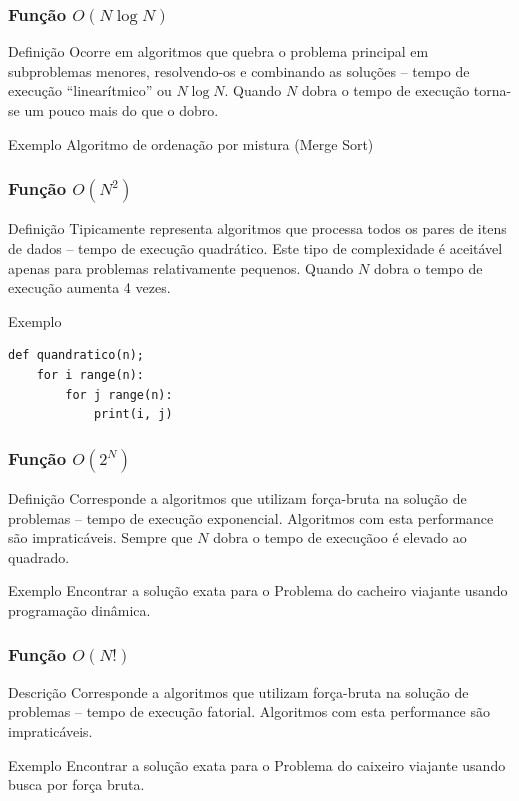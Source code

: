 \documentclass{beamer}
\begin{document}
\begin{frame}[fragile]
\frametitle{Função $O(N \log N)$}

\begin{block}{Definição}
Ocorre em algoritmos que quebra o problema principal em subproblemas menores, resolvendo-os e combinando as soluções -- tempo de execução ``linearítmico'' ou $N \log N$. Quando $N$ dobra o tempo de execução torna-se um pouco mais do que o dobro.
\end{block}\vfill

\begin{exampleblock}{Exemplo}
Algoritmo de ordenação por mistura (Merge Sort)
\end{exampleblock}
\end{frame}

\begin{frame}[fragile]
\frametitle{Função $O(N^{2})$}

\begin{block}{Definição}
Tipicamente representa algoritmos que processa todos os pares de itens de dados -- tempo de execução quadrático. Este tipo de complexidade é aceitável apenas para problemas relativamente pequenos. Quando $N$ dobra o tempo de execução aumenta 4 vezes.
\end{block}\vfill

\begin{exampleblock}{Exemplo}
\begin{lstlisting}
def quandratico(n);
    for i range(n):
        for j range(n):
            print(i, j)
\end{lstlisting}	
\end{exampleblock}
\end{frame}

\begin{frame}[fragile]
\frametitle{Função $O(2^{N})$}

\begin{block}{Definição}
Corresponde a algoritmos que utilizam força-bruta na solução de problemas -- tempo de execução exponencial. Algoritmos com esta performance são impraticáveis. Sempre que $N$ dobra o tempo de execuçãoo é elevado ao quadrado.
\end{block}\vfill

\begin{exampleblock}{Exemplo}
Encontrar a solução exata para o Problema do cacheiro viajante usando programação dinâmica.
\end{exampleblock}
\end{frame}

\begin{frame}[fragile]
\frametitle{Função $O(N!)$}

\begin{block}{Descrição}
Corresponde a algoritmos que utilizam força-bruta na solução de problemas -- tempo de execução fatorial. Algoritmos com esta performance são impraticáveis.
\end{block}\vfill

\begin{exampleblock}{Exemplo}
Encontrar a solução exata para o Problema do caixeiro viajante usando busca por força bruta.
\end{exampleblock}
\end{frame}
\end{document}
